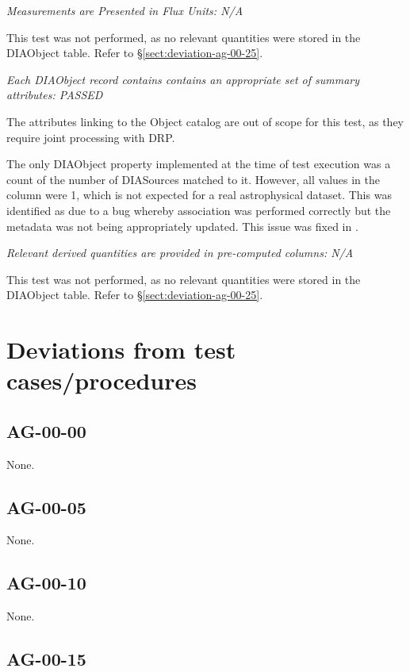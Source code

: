 \documentclass[DM,STR,toc]{lsstdoc}
\begin{document}
\textit{Measurements are Presented in Flux Units: N/A}

This test was not performed, as no relevant quantities were stored in the DIAObject table. Refer to \S\ref{sect:deviation-ag-00-25}.

\textit{Each DIAObject record contains contains an appropriate set of summary attributes: PASSED}

The attributes linking to the Object catalog are out of scope for this test, as
they require joint processing with DRP.

The only DIAObject property implemented at the time of test execution was a count of the number of DIASources matched to it.
However, all values in the column were 1, which is not expected for a real astrophysical dataset.
This was identified as due to a bug whereby association was performed correctly but the metadata was not being appropriately updated.
This issue was fixed in .

\textit{Relevant derived quantities are provided in pre-computed columns: N/A}

This test was not performed, as no relevant quantities were stored in the DIAObject table. Refer to \S\ref{sect:deviation-ag-00-25}.

\section{Deviations from test cases/procedures}

\subsection{AG-00-00}

None.

\subsection{AG-00-05}
\label{sect:deviation-ag-00-05}

None.

\subsection{AG-00-10}
\label{sect:deviation-ag-00-10}

None.

\subsection{AG-00-15}
\label{sect:deviation-ag-00-15}
\end{document}
